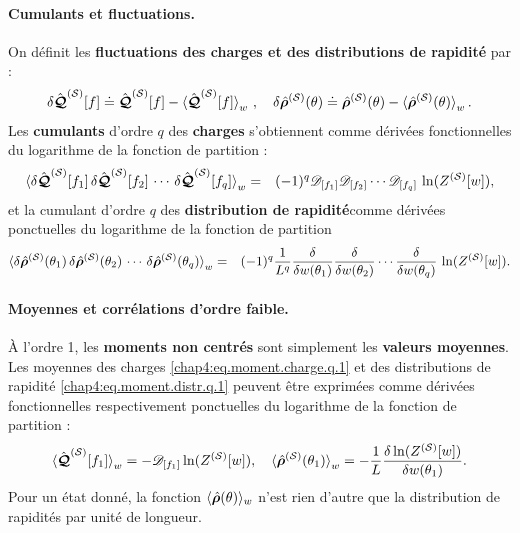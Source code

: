 \paragraph{Cumulants et fluctuations.}
On définit les {\bf fluctuations des charges et des distributions de rapidité} par : 
\begin{eqnarray}
	\delta \hat{\bm{\mathcal{Q}}}^{(\mathcal{S})}[f]	 \doteq \hat{\bm{\mathcal{Q}}}^{(\mathcal{S})}[f] - \braket{\hat{\bm{\mathcal{Q}}}^{(\mathcal{S})}[f]}_w \, ,  \quad \delta \hat{\bm{\rho}}^{(\mathcal{S})}(\theta)	 \doteq \hat{\bm{\rho}}^{(\mathcal{S})}(\theta) - \braket{\hat{\bm{\rho}}^{(\mathcal{S})}(\theta)}_w.
\end{eqnarray}
Les {\bf cumulants} d’ordre $q$ des {\bf charges} s’obtiennent comme dérivées fonctionnelles du logarithme de la fonction de partition :
\begin{eqnarray}\label{chap4:eq.cumulant.charge.q.1}
	\braket{\delta\hat{\bm{\mathcal{Q}}}^{(\mathcal{S})}[f_1] \, \delta\hat{\bm{\mathcal{Q}}}^{(\mathcal{S})}[f_2] \, \cdots \,  \delta\hat{\bm{\mathcal{Q}}}^{(\mathcal{S})}[f_q]}_w  & = & (-1)^q \mathscr{D}_{[f_1]} \mathscr{D}_{[f_2]} \cdots \mathscr{D}_{[f_q]}\,  \ln(Z^{(\mathcal{S})}[w]), 	
\end{eqnarray}
et la cumulant d'ordre $q$ des {\bf distribution de rapidité}comme dérivées ponctuelles du logarithme de la fonction de partition 
\begin{eqnarray}\label{chap4:eq.cumulant.distr.q.1}
	\braket{\delta \hat{\bm{\rho}}^{(\mathcal{S})}(\theta_1) \, \delta\hat{\bm{\rho}}^{(\mathcal{S})}(\theta_2) \, \cdots \,  \delta\hat{\bm{\rho}}^{(\mathcal{S})}(\theta_q)}_w  & = & (-1)^q \frac{1}{L^q} \frac{\delta}{\delta w(\theta_1)} \frac{\delta}{\delta w(\theta_2)} \cdots \frac{\delta}{\delta w(\theta_q)}\,  \ln (Z^{(\mathcal{S})}[w]). 	
\end{eqnarray}

\paragraph{Moyennes et corrélations d’ordre faible.}
À l’ordre 1, les {\bf moments non centrés} sont simplement les {\bf valeurs moyennes}. Les moyennes des charges \eqref{chap4:eq.moment.charge.q.1} et des distributions de rapidité \eqref{chap4:eq.moment.distr.q.1} peuvent être exprimées comme dérivées fonctionnelles respectivement ponctuelles  du logarithme de la fonction de partition :
\begin{eqnarray}\label{chap4:eq.moyenne.1}
	\braket{\hat{\bm{\mathcal{Q}}}^{(\mathcal{S})}[f_1]}_w   =  - \mathscr{D}_{[f_1]}  \ln(Z^{(\mathcal{S})}[w]), \quad \braket{\hat{\bm{\rho}}^{(\mathcal{S})}(\theta_1)}_w   =  - \frac{1}{L}\frac{\delta \ln(Z^{(\mathcal{S})}[w])}{\delta w(\theta_1)} .
\end{eqnarray}
Pour un état donné, la fonction $\langle \hat{\bm{\rho}}(\theta) \rangle_w$ n’est rien d’autre que la distribution de rapidités par unité de longueur.\\

